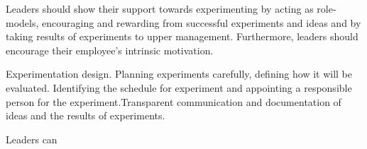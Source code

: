 Leaders should show their support towards experimenting by acting as role-models, encouraging and rewarding from successful experiments and ideas and by taking results of experiments to upper management. Furthermore, leaders should encourage their employee's intrinsic motivation.  

Experimentation design. Planning experiments carefully, defining how it will be evaluated. Identifying the schedule for experiment and appointing a responsible person for the experiment.Transparent communication and documentation of ideas and the results of experiments. 

Leaders can
